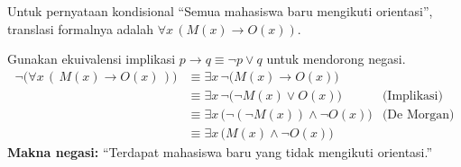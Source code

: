 \begin{contoh}
Untuk pernyataan kondisional ``Semua mahasiswa baru mengikuti orientasi'', translasi formalnya adalah $\forall x \, (M(x) \rightarrow O(x))$.

Gunakan ekuivalensi implikasi $p \rightarrow q \equiv \neg p \lor q$ untuk mendorong negasi.
\begin{align*}
    \neg \Big( \forall x \, (\,M(x) \rightarrow O(x)\,) \Big) 
    &\equiv \exists x \, \neg \Big( M(x) \rightarrow O(x) \Big) \\
    &\equiv \exists x \, \neg \Big( \neg M(x) \lor O(x) \Big) & \text{(Implikasi)} \\
    &\equiv \exists x \, \Big( \neg(\neg M(x)) \land \neg O(x) \Big) & \text{(De Morgan)} \\
    &\equiv \exists x \, \Big( M(x) \land \neg O(x) \Big)
\end{align*}
\textbf{Makna negasi:} ``Terdapat mahasiswa baru yang tidak mengikuti orientasi.''
\end{contoh}

